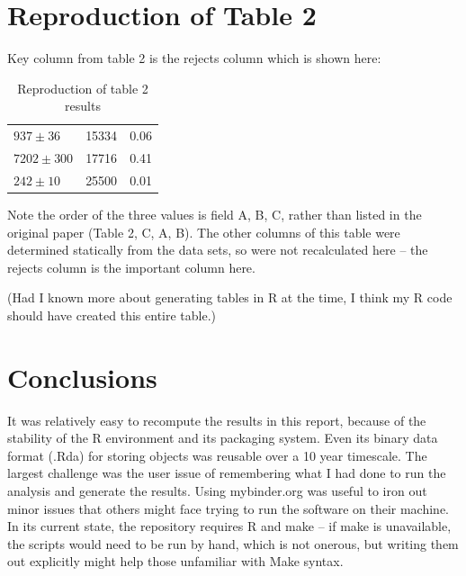 \hypertarget{reproduction-of-table-2}{%
\section{Reproduction of Table 2}\label{reproduction-of-table-2}}

Key column from table 2 is the rejects column which is shown here:

\begin{table}[h!]
  \centering
  \begin{tabular}{lll}
    \hline
    $937 \pm 36$ & 15334 & 0.06\\
    $7202 \pm 300$ & 17716 & 0.41\\
    $242 \pm 10$ & 25500 & 0.01\\
    \hline
  \end{tabular}
  \caption{Reproduction of table 2 results}
  \label{tab:rep}
\end{table}


Note the order of the three values is field A, B, C, rather than listed
in the original paper (Table 2, C, A, B). The other columns of this
table were determined statically from the data sets, so were not
recalculated here -- the rejects column is the important column here.

(Had I known more about generating tables in R at the time, I think my R
code should have created this entire table.)

\section{Conclusions}

It was relatively easy to recompute the results in this report, because
of the stability of the R environment and its packaging system. Even its
binary data format (.Rda) for storing objects was reusable over a 10
year timescale. The largest challenge was the user issue of remembering
what I had done to run the analysis and generate the results. Using
mybinder.org was useful to iron out minor issues that others might face
trying to run the software on their machine. In its current state, the
repository requires R and make -- if make is unavailable, the scripts
would need to be run by hand, which is not onerous, but writing them out
explicitly might help those unfamiliar with Make syntax.

